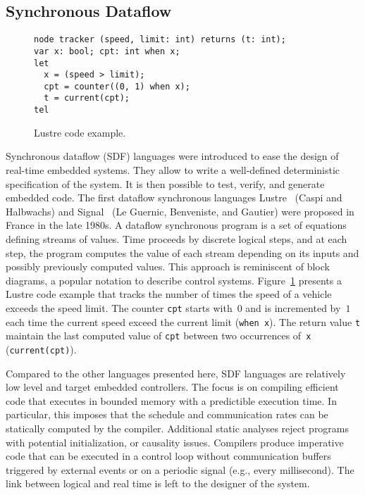\subsection{Synchronous Dataflow}\label{sec:sdf} %

\begin{figure}[!h]
\begin{lstlisting}
node tracker (speed, limit: int) returns (t: int);
var x: bool; cpt: int when x;
let
  x = (speed > limit);
  cpt = counter((0, 1) when x);
  t = current(cpt);
tel
\end{lstlisting}
\vspace*{-4mm}
\caption{\label{fig:lustre} Lustre code example.}
\end{figure}

Synchronous dataflow (SDF) languages were introduced to ease the design of
real-time embedded systems. They allow to write a well-defined
deterministic specification of the system. It is then possible to
test, verify, and generate embedded code.
The first data\-flow synchronous languages Lustre~\cite{lustre_1987}
(Caspi and Halbwachs) and Signal~\cite{signal_1991} (Le Guernic,
Benveniste, and Gautier) were proposed in France in the late 1980s.
A dataflow synchronous program is a set of equations defining streams
of values. Time proceeds by discrete logical steps, and at each step,
the program computes the value of each stream depending on its inputs
and possibly previously computed values.
This approach is reminiscent of block diagrams, a popular notation to
describe control systems.
Figure~\ref{fig:lustre} presents a Lustre code example that tracks the
number of times the speed of a vehicle exceeds the speed limit. The
counter \lstinline{cpt} starts with~$0$ and is incremented by~$1$ each
time the current speed exceed the current limit (\lstinline{when x}).
The return value \lstinline{t} maintain the last computed value
of \lstinline{cpt} between two occurrences of~\lstinline{x}
(\lstinline{current(cpt)}).

Compared to the other languages presented here, SDF languages are
relatively low level and target embedded controllers. The focus is on
compiling efficient code that executes in bounded memory with a
predictible execution time.  In particular, this imposes that the
schedule and communication rates can be statically computed by the
compiler. Additional static analyses reject programs with potential
initialization, or causality issues. Compilers produce imperative code
that can be executed in a control loop without communication buffers
triggered by external events or on a periodic signal (e.g., every
millisecond). The link between logical and real time is left to the
designer of the system.

